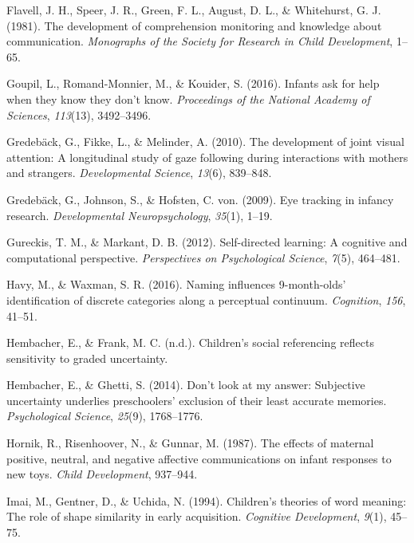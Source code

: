 \documentclass[man]{apa6}
\theoremstyle{definition}
\theoremstyle{definition}
\theoremstyle{definition}
\theoremstyle{remark}
\begin{document}
\hypertarget{ref-flavell1981development}{}
Flavell, J. H., Speer, J. R., Green, F. L., August, D. L., \&
Whitehurst, G. J. (1981). The development of comprehension monitoring
and knowledge about communication. \emph{Monographs of the Society for
Research in Child Development}, 1--65.

\hypertarget{ref-goupil2016infants}{}
Goupil, L., Romand-Monnier, M., \& Kouider, S. (2016). Infants ask for
help when they know they don't know. \emph{Proceedings of the National
Academy of Sciences}, \emph{113}(13), 3492--3496.

\hypertarget{ref-gredeback2010development}{}
Gredebäck, G., Fikke, L., \& Melinder, A. (2010). The development of
joint visual attention: A longitudinal study of gaze following during
interactions with mothers and strangers. \emph{Developmental Science},
\emph{13}(6), 839--848.

\hypertarget{ref-gredeback2009eye}{}
Gredebäck, G., Johnson, S., \& Hofsten, C. von. (2009). Eye tracking in
infancy research. \emph{Developmental Neuropsychology}, \emph{35}(1),
1--19.

\hypertarget{ref-gureckis2012self}{}
Gureckis, T. M., \& Markant, D. B. (2012). Self-directed learning: A
cognitive and computational perspective. \emph{Perspectives on
Psychological Science}, \emph{7}(5), 464--481.

\hypertarget{ref-havy2016naming}{}
Havy, M., \& Waxman, S. R. (2016). Naming influences 9-month-olds'
identification of discrete categories along a perceptual continuum.
\emph{Cognition}, \emph{156}, 41--51.

\hypertarget{ref-hembacherchildren}{}
Hembacher, E., \& Frank, M. C. (n.d.). Children's social referencing
reflects sensitivity to graded uncertainty.

\hypertarget{ref-hembacher2014don}{}
Hembacher, E., \& Ghetti, S. (2014). Don't look at my answer: Subjective
uncertainty underlies preschoolers' exclusion of their least accurate
memories. \emph{Psychological Science}, \emph{25}(9), 1768--1776.

\hypertarget{ref-hornik1987effects}{}
Hornik, R., Risenhoover, N., \& Gunnar, M. (1987). The effects of
maternal positive, neutral, and negative affective communications on
infant responses to new toys. \emph{Child Development}, 937--944.

\hypertarget{ref-imai1994children}{}
Imai, M., Gentner, D., \& Uchida, N. (1994). Children's theories of word
meaning: The role of shape similarity in early acquisition.
\emph{Cognitive Development}, \emph{9}(1), 45--75.
\end{document}

